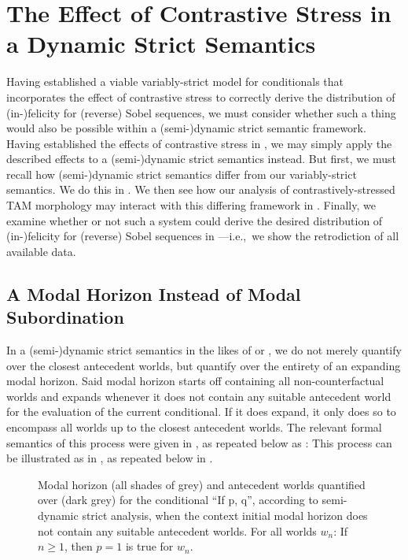 \section{The Effect of Contrastive Stress in a Dynamic Strict Semantics}
Having established a viable variably-strict model for conditionals that incorporates the effect of contrastive stress to correctly derive the distribution of (in-)felicity for (reverse) Sobel sequences, we must consider whether such a thing would also be possible within a (semi-)dynamic strict semantic framework. Having established the effects of contrastive stress in , we may simply apply the described effects to a (semi-)dynamic strict semantics instead. But first, we must recall how (semi-)dynamic strict semantics differ from our variably-strict semantics. We do this in . We then see how our analysis of contrastively-stressed TAM morphology may interact with this differing framework in . Finally, we examine whether or not such a system could derive the desired distribution of (in-)felicity for (reverse) Sobel sequences in ---i.e.,~we show the retrodiction of all available data.

\subsection{A Modal Horizon Instead of Modal Subordination}
In a (semi-)dynamic strict semantics in the likes of \textcite{Fintel2001} or \textcite{Gillies2007}, we do not merely quantify over the closest antecedent worlds, but quantify over the entirety of an expanding modal horizon. Said modal horizon starts off containing all non-counterfactual worlds and expands whenever it does not contain any suitable antecedent world for the evaluation of the current conditional. If it does expand, it only does so to encompass all worlds up to the closest antecedent worlds. The relevant formal semantics of this process were given in , as repeated below as :
\pex\label{def:fintel-repeat}\xe
This process can be illustrated as in , as repeated below in .
\begin{figure}[!htb]
\resizebox{\textwidth}{!}{}
\caption{Modal horizon (all shades of grey) and antecedent worlds quantified over (dark grey) for the conditional \enquote{If p, q}, according to  semi-dynamic strict analysis, when the context initial modal horizon does not contain any suitable antecedent worlds. For all worlds $w_n$: If $n\geqslant1$, then $p=1$ is true for $w_n$.}
\end{figure}

